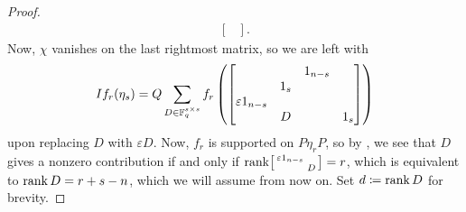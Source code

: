 \begin{proof}
\begin{align*}
\begin{bmatrix}
		\end{bmatrix}.
	\end{align*}
	Now, $\chi$ vanishes on the last rightmost matrix,
    so we are left with
	\[If_r(\eta_s)=Q\sum_{D\in\mathbb F_q^{s\times s}}f_r\left(\begin{bmatrix}
		&& 1_{n-s} \\ & 1_s \\
		\varepsilon1_{n-s} &   &   \\ &  D &   & 1_s
	\end{bmatrix}\right)\]
    upon replacing $D$ with $\varepsilon D$.
	Now, $f_r$ is supported on $P\eta_rP$, so by , we see that $D$ gives a nonzero contribution if and only if \(\operatorname{rank}\begin{bsmallmatrix}
		\varepsilon1_{n-s} \\ & D
	\end{bsmallmatrix}=r\), which is equivalent to $\operatorname{rank}D=r+s-n$, which we will assume from now on. Set $d\coloneqq\operatorname{rank}D$ for brevity.
	

\end{proof}
